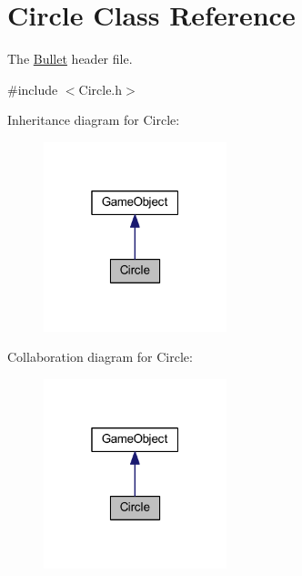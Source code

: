 \hypertarget{class_circle}{\section{Circle Class Reference}
\label{class_circle}
}


The \hyperlink{class_bullet}{Bullet} header file.  




{\ttfamily \#include $<$Circle.\+h$>$}



Inheritance diagram for Circle\+:\nopagebreak
\begin{figure}[H]
\begin{center}
\leavevmode
\includegraphics[width=151pt]{class_circle__inherit__graph}
\end{center}
\end{figure}


Collaboration diagram for Circle\+:\nopagebreak
\begin{figure}[H]
\begin{center}
\leavevmode
\includegraphics[width=151pt]{class_circle__coll__graph}
\end{center}
\end{figure}
